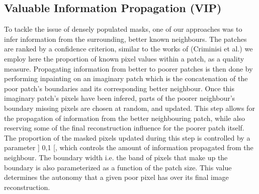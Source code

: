 \subsection{Valuable Information Propagation (VIP)}
To tackle the issue of densely populated masks, one of our approaches was to infer information from the surrounding, better known neighbours. The patches are ranked by a confidence criterion, similar to the works of (Criminisi et al.) we employ here the proportion of known pixel values within a patch, as a quality measure. Propagating information from better to poorer patches is then done by performing inpainting on an imaginary patch which is the concatenation of the poor patch's boundaries and its corresponding better neighbour. Once this imaginary patch's pixels have been infered, parts of the poorer neighbour's boundary missing pixels are chosen at random, and updated. This step allows for the propagation of information from the better neighbouring patch, while also reserving some of the final reconstruction influence for the poorer patch itself. The proportion of the masked pixels updated during this step is controlled by a parameter \epsilon \in \left] 0,1 \right[, which controls the amount of information propagated from the neighbour. The boundary width i.e. the band of pixels that make up the boundary is also parameterized as a function of the patch size. This value determines the autonomy that a given poor pixel has over its final image reconstruction. 

